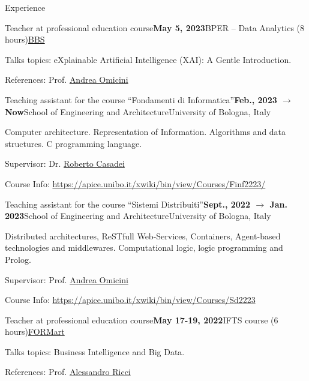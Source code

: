 \documentclass{resume} %
\begin{document}
    \begin{rSection}{Experience}
        
        \begin{rSubsection}{Teacher at professional education course}{\textbf{May 5, 2023}}{BPER -- Data Analytics (8 hours)}{\href{https://www.bbs.unibo.eu/}{BBS}}
            \item Talks topics: eXplainable Artificial Intelligence (XAI): A Gentle Introduction.
            \item References:  Prof. \href{mailto:andrea.omicini@unibo.it}{Andrea Omicini}
        \end{rSubsection}
        
        \begin{rSubsection}{Teaching assistant for the course ``Fondamenti di Informatica''}{\textbf{Feb., 2023 $\rightarrow$ Now}}{School of Engineering and Architecture}{University of Bologna, Italy}
            \item Computer architecture. Representation of Information. Algorithms and data structures. C programming language.
            \item Supervisor: Dr. \href{mailto:roberto.casadei@unibo.it}{Roberto Casadei}
            \item Course Info: \url{https://apice.unibo.it/xwiki/bin/view/Courses/Finf2223/}
        \end{rSubsection}
        
        \begin{rSubsection}{Teaching assistant for the course ``Sistemi Distribuiti''}{\textbf{Sept., 2022 $\rightarrow$ Jan. 2023}}{School of Engineering and Architecture}{University of Bologna, Italy}
            \item Distributed architectures, ReSTfull Web-Services, Containers, Agent-based technologies and middlewares. Computational logic, logic programming and Prolog.
            \item Supervisor: Prof. \href{mailto:andrea.omicini@unibo.it}{Andrea Omicini}
            \item Course Info: \url{https://apice.unibo.it/xwiki/bin/view/Courses/Sd2223}
        \end{rSubsection}
        
        \begin{rSubsection}{Teacher at professional education course}{\textbf{May 17-19, 2022}}{IFTS course (6 hours)}{\href{http://www.formart.it/home}{FORMart}}
            \item Talks topics: Business Intelligence and Big Data.
            \item References:  Prof. \href{mailto:a.ricci@unibo.it}{Alessandro Ricci}
        \end{rSubsection}
        

\end{rSection}
\end{document}
